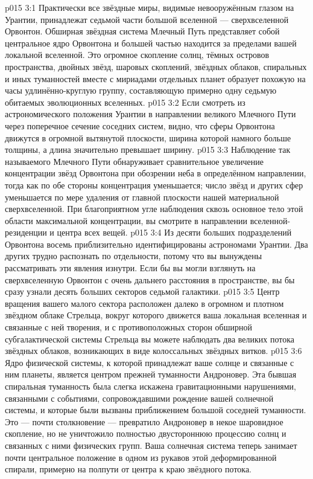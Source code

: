 \vs p015 3:1 Практически все звёздные миры, видимые невооружённым глазом на Урантии, принадлежат седьмой части большой вселенной --- сверхвселенной Орвонтон. Обширная звёздная система Млечный Путь представляет собой центральное ядро Орвонтона и большей частью находится за пределами вашей локальной вселенной. Это огромное скопление солнц, тёмных островов пространства, двойных звёзд, шаровых скоплений, звёздных облаков, спиральных и иных туманностей вместе с мириадами отдельных планет образует похожую на часы удлинённо\hyp{}круглую группу, составляющую примерно одну седьмую обитаемых эволюционных вселенных.
\vs p015 3:2 Если смотреть из астрономического положения Урантии в направлении великого Млечного Пути через поперечное сечение соседних систем, видно, что сферы Орвонтона движутся в огромной вытянутой плоскости, ширина которой намного больше толщины, а длина значительно превышает ширину.
\vs p015 3:3 Наблюдение так называемого Млечного Пути обнаруживает сравнительное увеличение концентрации звёзд Орвонтона при обозрении неба в определённом направлении, тогда как по обе стороны концентрация уменьшается; число звёзд и других сфер уменьшается по мере удаления от главной плоскости нашей материальной сверхвселенной. При благоприятном угле наблюдения сквозь основное тело этой области максимальной концентрации, вы смотрите в направлении вселенной\hyp{}резиденции и центра всех вещей.
\vs p015 3:4 \pc Из десяти больших подразделений Орвонтона восемь приблизительно идентифицированы астрономами Урантии. Два других трудно распознать по отдельности, потому что вы вынуждены рассматривать эти явления изнутри. Если бы вы могли взглянуть на сверхвселенную Орвонтон с очень дальнего расстояния в пространстве, вы бы сразу узнали десять больших секторов седьмой галактики.
\vs p015 3:5 Центр вращения вашего малого сектора расположен далеко в огромном и плотном звёздном облаке Стрельца, вокруг которого движется ваша локальная вселенная и связанные с ней творения, и с противоположных сторон обширной субгалактической системы Стрельца вы можете наблюдать два великих потока звёздных облаков, возникающих в виде колоссальных звёздных витков.
\vs p015 3:6 Ядро физической системы, к которой принадлежат ваше солнце и связанные с ним планеты, является центром прежней туманности Андроновер. Эта бывшая спиральная туманность была слегка искажена гравитационными нарушениями, связанными с событиями, сопровождавшими рождение вашей солнечной системы, и которые были вызваны приближением большой соседней туманности. Это --- почти столкновение --- превратило Андроновер в некое шаровидное скопление, но не уничтожило полностью двустороннюю процессию солнц и связанных с ними физических групп. Ваша солнечная система теперь занимает почти центральное положение в одном из рукавов этой деформированной спирали, примерно на полпути от центра к краю звёздного потока.
